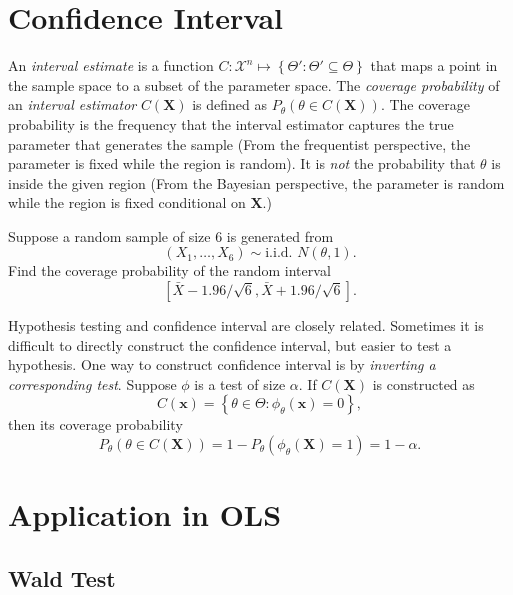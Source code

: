 \documentclass[11pt]{article}
\begin{document}
    \section{Confidence Interval}\label{confidence-interval}

An \emph{interval estimate} is a function
\(C:\mathcal{X}^{n}\mapsto\left\{ \Theta':\Theta'\subseteq\Theta\right\}\)
that maps a point in the sample space to a subset of the parameter
space. The \emph{coverage probability} of an \emph{interval estimator}
\(C\left(\mathbf{X}\right)\) is defined as
\(P_{\theta}\left(\theta\in C\left(\mathbf{X}\right)\right)\). The
coverage probability is the frequency that the interval estimator
captures the true parameter that generates the sample (From the
frequentist perspective, the parameter is fixed while the region is
random). It is \emph{not} the probability that \(\theta\) is inside the
given region (From the Bayesian perspective, the parameter is random
while the region is fixed conditional on \(\mathbf{X}\).)

Suppose a random sample of size 6 is generated from
\[\left(X_{1},\ldots,X_{6}\right)\sim\text{i.i.d. }N\left(\theta,1\right).\]
Find the coverage probability of the random interval
\[\left[\bar{X}-1.96/\sqrt{6},\bar{X}+1.96/\sqrt{6}\right].\]

Hypothesis testing and confidence interval are closely related.
Sometimes it is difficult to directly construct the confidence interval,
but easier to test a hypothesis. One way to construct confidence
interval is by \emph{inverting a corresponding test}. Suppose \(\phi\)
is a test of size \(\alpha\). If \(C\left(\mathbf{X}\right)\) is
constructed as
\[C\left(\mathbf{x}\right)=\left\{ \theta\in\Theta:\phi_{\theta}\left(\mathbf{x}\right)=0\right\},\]
then its coverage probability
\[P_{\theta}\left(\theta\in C\left(\mathbf{X}\right)\right)=1-P_{\theta}\left(\phi_{\theta}\left(\mathbf{X}\right)=1\right)=1-\alpha.\]

    \section{Application in OLS}\label{application-in-ols}

\subsection{Wald Test}\label{wald-test}
\end{document}
